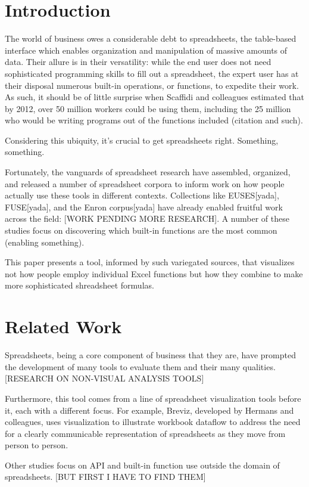 \documentclass[conference]{IEEEtran}
\begin{document}
\section{Introduction}
The world of business owes a considerable debt to spreadsheets, the table-based interface which enables organization and manipulation of massive amounts of data. Their allure is in their versatility: while the end user does not need sophisticated programming skills to fill out a spreadsheet, the expert user has at their disposal numerous built-in operations, or functions, to expedite their work. As such, it should be of little surprise when Scaffidi and colleagues estimated that by 2012, over 50 million workers could be using them, including the 25 million who would be writing programs out of the functions included (citation and such).\par

Considering this ubiquity, it's crucial to get spreadsheets right. Something, something. \par

Fortunately, the vanguards of spreadsheet research have assembled, organized, and released a number of spreadsheet corpora to inform work on how people actually use these tools in different contexts. Collections like EUSES[yada], FUSE[yada], and the Enron corpus[yada] have already enabled fruitful work across the field: [WORK PENDING MORE RESEARCH]. A number of these studies focus on discovering which built-in functions are the most common (enabling something). \par

This paper presents a tool, informed by such variegated sources, that visualizes not how people employ individual Excel functions but how they combine to make more sophisticated shreadsheet formulas. 


\section{Related Work}
Spreadsheets, being a core component of business that they are, have prompted the development of many tools to evaluate them and their many qualities. [RESEARCH ON NON-VISUAL ANALYSIS TOOLS] \par
Furthermore, this tool comes from a line of spreadsheet visualization tools before it, each with a different focus. For example, Breviz, developed by Hermans and colleagues, uses visualization to illustrate workbook dataflow to address the need for a clearly communicable representation of spreadsheets as they move from person to person. \par
Other studies focus on API and built-in function use outside the domain of spreadsheets. [BUT FIRST I HAVE TO FIND THEM]  
\end{document}
